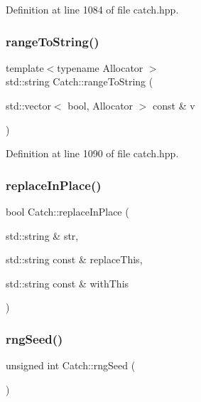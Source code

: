 Definition at line 1084 of file catch.\+hpp.

\mbox{\label{namespace_catch_ae162dc66b7767a52e7e4283915fd3d9f}} 
\subsubsection{\texorpdfstring{range\+To\+String()}{rangeToString()}\hspace{0.1cm}{\footnotesize\ttfamily [2/2]}}
{\footnotesize\ttfamily template$<$typename Allocator $>$ \\
std\+::string Catch\+::range\+To\+String (\begin{DoxyParamCaption}\item[{std\+::vector$<$ bool, Allocator $>$ const \&}]{v }\end{DoxyParamCaption})}



Definition at line 1090 of file catch.\+hpp.

\mbox{\label{namespace_catch_afe4e6770da547e43e9e4eeaa05f946ea}} 
\subsubsection{\texorpdfstring{replace\+In\+Place()}{replaceInPlace()}}
{\footnotesize\ttfamily bool Catch\+::replace\+In\+Place (\begin{DoxyParamCaption}\item[{std\+::string \&}]{str,  }\item[{std\+::string const \&}]{replace\+This,  }\item[{std\+::string const \&}]{with\+This }\end{DoxyParamCaption})}

\mbox{\label{namespace_catch_acf5ea05e942d2d7fe79111e12754ed76}} 
\subsubsection{\texorpdfstring{rng\+Seed()}{rngSeed()}}
{\footnotesize\ttfamily unsigned int Catch\+::rng\+Seed (\begin{DoxyParamCaption}{ }\end{DoxyParamCaption})}

